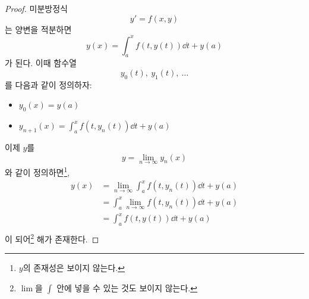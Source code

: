 \documentclass[../engineering_mathematics_lecture_note.tex]{subfiles}
\begin{document}
\begin{proof}
    미분방정식
    \begin{equation*}
        y' = f(x, y)
    \end{equation*}
    는 양변을 적분하면
    \begin{equation*}
        y(x) = \int_a^x{f(t, y(t)) \dd{t}} + y(a)
    \end{equation*}
    가 된다.
    이때 함수열
    \begin{equation*}
        y_0(t),\ y_1(t),\ \dots
    \end{equation*}
    를 다음과 같이 정의하자:
    \begin{itemize}
        \item $y_0(x) = y(a)$
        \item $y_{n + 1}(x) = \int_a^x{f(t, y_n(t)) \dd{t}} + y(a)$
    \end{itemize}
    이제 $y$를
    \begin{equation*}
        y = \lim_{n \rightarrow \infty} y_n(x)
    \end{equation*}
    와 같이 정의하면\footnote{$y$의 존재성은 보이지 않는다.},
    \begin{align*}
        y(x) &= \lim_{n \rightarrow \infty} \int_a^x{f(t, y_n(t)) \dd{t}} + y(a)\\
             &= \int_a^x{\lim_{n \rightarrow \infty} f(t, y_n(t)) \dd{t}} + y(a)\\
             &= \int_a^x{f(t, y(t)) \dd{t}} + y(a)\\
    \end{align*}
    이 되어\footnote{$\lim$을 $\int$ 안에 넣을 수 있는 것도 보이지 않는다.} 해가 존재한다.
\end{proof}
\end{document}
